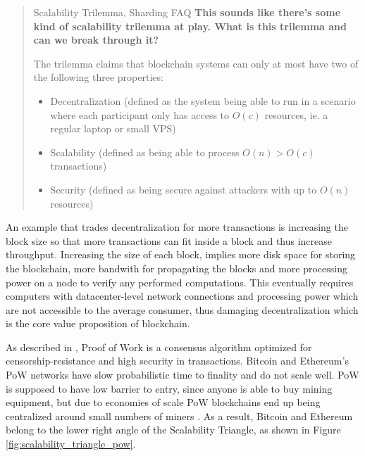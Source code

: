 \begin{quote}{Scalability Trilemma, Sharding FAQ}
    \textbf{This sounds like there’s some kind of scalability trilemma at play. What is this trilemma and can we break through it?}

    The trilemma claims that blockchain systems can only at most have two of the following three properties:

    \begin{itemize}
        \item Decentralization (defined as the system being able to run in a scenario where each participant only has access to $O(c)$ resources, ie. a regular laptop or small VPS)
        \item Scalability (defined as being able to process $O(n) > O(c)$ transactions)
        \item Security (defined as being secure against attackers with up to $O(n)$ resources)
    \end{itemize}
\end{quote}

An example that trades decentralization for more transactions is increasing the block size so that more transactions can fit inside a block and thus increase throughput. Increasing the size of each block, implies more disk space for storing the blockchain, more bandwith for propagating the blocks and more processing power on a node to verify any performed computations. This eventually requires computers with datacenter-level network connections and processing power which are not accessible to the average consumer, thus damaging decentralization which is the core value proposition of blockchain. %

As described in \cite{scaling-trustless-models}, Proof of Work is a consensus algorithm optimized for censorship-resistance and high security in transactions.  Bitcoin and Ethereum's PoW networks have slow probabilistic time to finality and do not scale well. PoW is supposed to have low barrier to entry, since anyone is able to buy mining equipment, but due to economies of scale PoW blockchains end up being centralized around small numbers of miners \cite{Gencer2018DecentralizationIB}. As a result, Bitcoin and Ethereum belong to the lower right angle of the Scalability Triangle, as shown in Figure \ref{fig:scalability_triangle_pow}. 


